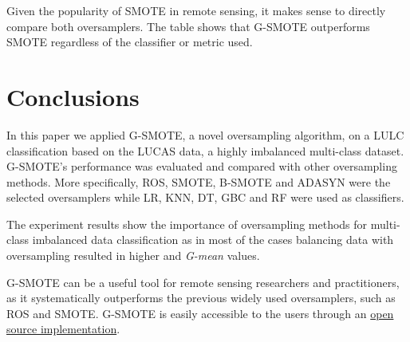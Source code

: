 \documentclass[remotesensing,article,submit,moreauthors,pdftex]{Definitions/mdpi}
\begin{document}
Given the popularity of SMOTE in remote sensing, it makes sense to directly
compare both oversamplers. The table shows that G-SMOTE outperforms SMOTE
regardless of the classifier or metric used.

\section{Conclusions}

In this paper we applied G-SMOTE, a novel oversampling algorithm, on a LULC
classification based on the LUCAS data, a highly imbalanced multi-class dataset.
G-SMOTE's performance was evaluated and compared with other oversampling
methods. More specifically, ROS, SMOTE, B-SMOTE and ADASYN were the selected
oversamplers while LR, KNN, DT, GBC and RF were used as classifiers.

The experiment results show the importance of oversampling methods for
multi-class imbalanced data classification as in most of the cases balancing
data with oversampling resulted in higher  and \textit{G-mean}
values.

G-SMOTE can be a useful tool for remote sensing researchers and practitioners,
as it systematically outperforms the previous widely used oversamplers, such as
ROS and SMOTE. G-SMOTE is easily accessible to the users through an
\href{https://geometric-smote.readthedocs.io/en/latest/?badge=latest}{open
source implementation}.

\vspace{6pt}




\end{document}
